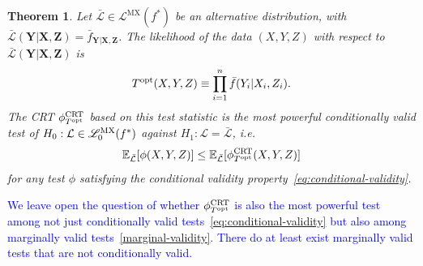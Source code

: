 \documentclass[ejs]{imsart}
\numberwithin{equation}{section}
\theoremstyle{plain}
\newtheorem{theorem}{Theorem}[section]
\theoremstyle{definition}
\theoremstyle{remark}
\newcommand{\prx}{\bm X}
\newcommand{\srx}{X}
\newcommand{\prz}{\bm Z}
\newcommand{\srz}{Z}
\newcommand{\pry}{{\bm Y}}
\newcommand{\sry}{Y}
\def\CRT{\textnormal{CRT}}
\begin{document}
\begin{theorem} \label{prop:crt-optimality}
	Let $\bar{\mathcal L} \in \mathscr L^{\text{MX}}(f^*)$ be an alternative distribution, with $\bar{\mathcal L}(\pry|\prx,\prz) = \bar f_{\pry|\prx,\prz}$. The likelihood of the data $(\srx, \sry, \srz)$ with respect to $\bar{\mathcal L}(\pry|\prx,\prz)$ is
	\begin{equation}
	T^{\textnormal{opt}}(\srx, \sry, \srz) \equiv \prod_{i = 1}^n  \bar f(\sry_i|\srx_i, \srz_i).
	\label{log-likelihood-ratio}
	\end{equation}
	The CRT $\phi^{\CRT}_{T^{\textnormal{opt}}}$ based on this test statistic is the most powerful conditionally valid test of $H_0: \mathcal L \in \mathscr L_0^{\textnormal{MX}}(f^*)$ against $H_1: \mathcal L = \bar{\mathcal L}$, i.e. 
	\begin{equation}
	\mathbb E_{\bar{\mathcal L}}[\phi(\srx,\sry,\srz)] \leq \mathbb E_{\bar{\mathcal L}}[\phi^{\CRT}_{T^\textnormal{opt}}(\srx, \sry, \srz)]
	\label{unconditional}
	\end{equation}
	for any test $\phi$ satisfying the conditional validity property~\eqref{eq:conditional-validity}.
\end{theorem}

\textcolor{blue}{We leave open the question of whether $\phi^{\CRT}_{T^\textnormal{opt}}$ is also the most powerful test among not just conditionally valid tests~\eqref{eq:conditional-validity} but also among marginally valid tests~\eqref{marginal-validity}. There do at least exist marginally valid tests that are not conditionally valid.}
\end{document}
